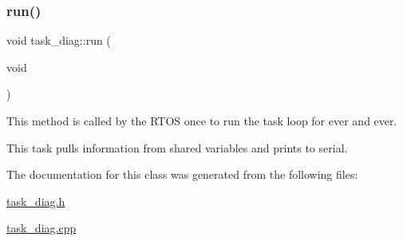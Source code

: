 \subsubsection{\texorpdfstring{run()}{run()}}
{\footnotesize\ttfamily void task\+\_\+diag\+::run (\begin{DoxyParamCaption}\item[{void}]{ }\end{DoxyParamCaption})}

This method is called by the R\+T\+OS once to run the task loop for ever and ever.

This task pulls information from shared variables and prints to serial. 

The documentation for this class was generated from the following files\+:\begin{DoxyCompactItemize}
\item 
\mbox{\hyperlink{task__diag_8h}{task\+\_\+diag.\+h}}\item 
\mbox{\hyperlink{task__diag_8cpp}{task\+\_\+diag.\+cpp}}\end{DoxyCompactItemize}
